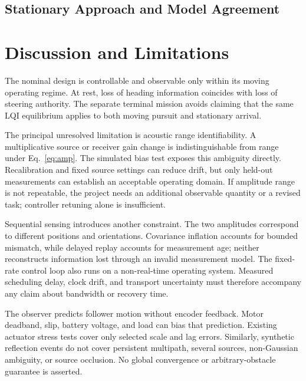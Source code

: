 \subsection{Stationary Approach and Model Agreement}


\section{Discussion and Limitations}
The nominal design is controllable and observable only within its moving operating regime. At rest, loss of heading information coincides with loss of steering authority. The separate terminal mission avoids claiming that the same LQI equilibrium applies to both moving pursuit and stationary arrival.

The principal unresolved limitation is acoustic range identifiability. A multiplicative source or receiver gain change is indistinguishable from range under Eq.~\eqref{eq:amp}. The simulated bias test exposes this ambiguity directly. Recalibration and fixed source settings can reduce drift, but only held-out measurements can establish an acceptable operating domain. If amplitude range is not repeatable, the project needs an additional observable quantity or a revised task; controller retuning alone is insufficient.

Sequential sensing introduces another constraint. The two amplitudes correspond to different positions and orientations. Covariance inflation accounts for bounded mismatch, while delayed replay accounts for measurement age; neither reconstructs information lost through an invalid measurement model. The fixed-rate control loop also runs on a non-real-time operating system. Measured scheduling delay, clock drift, and transport uncertainty must therefore accompany any claim about bandwidth or recovery time.

The observer predicts follower motion without encoder feedback. Motor deadband, slip, battery voltage, and load can bias that prediction. Existing actuator stress tests cover only selected scale and lag errors. Similarly, synthetic reflection events do not cover persistent multipath, several sources, non-Gaussian ambiguity, or source occlusion. No global convergence or arbitrary-obstacle guarantee is asserted.

